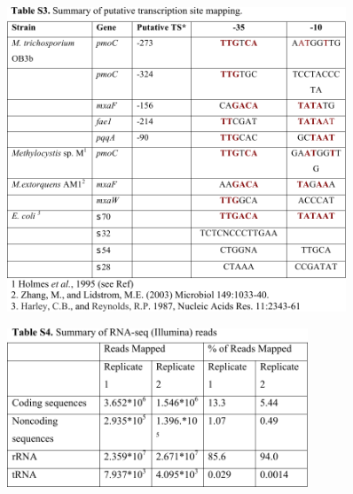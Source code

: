 \begin{figure}[H]
\centering
    \begin{singlespace}
    \includegraphics[width=0.9\textwidth]{./tex/chapter1/figures/supplemental/TableS3.pdf}
    \end{singlespace}
\end{figure}

\begin{figure}[H]
\centering
    \begin{singlespace}
    \includegraphics[width=0.8\textwidth]{./tex/chapter1/figures/supplemental/TableS4.pdf}
    \end{singlespace}
\end{figure}

